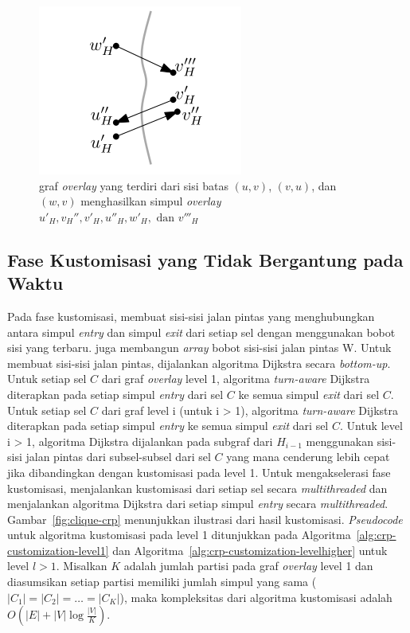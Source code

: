\begin{figure}[H]
    \centering
    \includegraphics[]{figures/overlay_crp.png}
    \caption{graf \textit{overlay} yang terdiri dari sisi batas $(u,v)$, $(v,u)$, dan $(w,v)$ menghasilkan simpul \textit{overlay} $u'_{H},v_H'',v'_H,u''_H,w'_H, \text{ dan }v'''_H$ }
    \label{fig:crp-overlay2}
\end{figure}




\subsection{Fase Kustomisasi yang Tidak Bergantung pada Waktu}
\label{subsec:tdcrp-kustomisasi}
Pada fase kustomisasi, \cite{Delling2015} membuat sisi-sisi jalan pintas yang menghubungkan antara simpul \textit{entry} dan simpul \textit{exit} dari setiap sel dengan menggunakan bobot sisi yang terbaru. \cite{Delling2015} juga membangun \textit{array} bobot sisi-sisi jalan pintas W. Untuk membuat sisi-sisi jalan pintas, dijalankan algoritma Dijkstra secara \textit{bottom-up}. Untuk setiap sel $C$ dari graf \textit{overlay} level 1, algoritma \textit{turn-aware} Dijkstra diterapkan pada setiap simpul \textit{entry} dari sel $C$ ke semua simpul \textit{exit} dari sel $C$. Untuk setiap sel $C$ dari graf level i (untuk i > 1), algoritma \textit{turn-aware} Dijkstra diterapkan pada setiap simpul \textit{entry} ke semua simpul \textit{exit} dari sel $C$. Untuk level i > 1, algoritma Dijkstra dijalankan pada subgraf dari $H_{i-1}$ menggunakan sisi-sisi jalan pintas dari subsel-subsel dari sel $C$ yang mana cenderung lebih cepat jika dibandingkan dengan kustomisasi pada level 1. Untuk mengakselerasi fase kustomisasi, \cite{Delling2015} menjalankan kustomisasi dari setiap sel secara \textit{multithreaded} dan menjalankan algoritma Dijkstra dari setiap simpul \textit{entry} secara \textit{multithreaded}. Gambar~\ref{fig:clique-crp} menunjukkan ilustrasi dari hasil kustomisasi. \textit{Pseudocode} untuk algoritma kustomisasi pada level 1 ditunjukkan pada Algoritma~\ref{alg:crp-customization-level1} dan Algoritma~\ref{alg:crp-customization-levelhigher} untuk level $l>1$. Misalkan $K$ adalah jumlah partisi pada graf \textit{overlay} level 1 dan diasumsikan setiap partisi memiliki jumlah simpul yang sama ($|C_1|=|C_2|=\ldots =|C_K|$), maka kompleksitas dari algoritma kustomisasi adalah $O(|E|+|V|\log \frac{|V|}{K})$.

